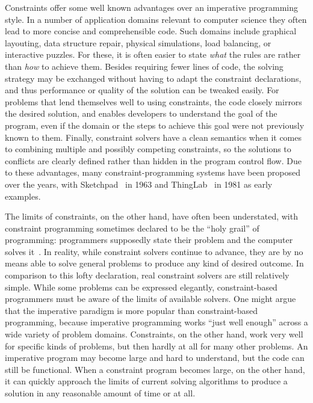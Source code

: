 Constraints offer some well known advantages over an imperative programming
style. In a number of application domains relevant to computer science they
often lead to more concise and comprehensible code. Such domains include
graphical layouting, data structure repair, physical simulations, load
balancing, or interactive puzzles. For these, it is often easier to state
\emph{what} the rules are rather than \emph{how} to achieve them. Besides
requiring fewer lines of code, the solving strategy may be exchanged without
having to adapt the constraint declarations, and thus performance or quality of
the solution can be tweaked easily. For problems that lend themselves well to
using constraints, the code closely mirrors the desired solution, and enables
developers to understand the goal of the program, even if the domain or the
steps to achieve this goal were not previously known to them. Finally, constraint
solvers have a clean semantics when it comes to combining multiple and possibly
competing constraints, so the solutions to conflicts are clearly defined rather
than hidden in the program control flow. Due to these advantages, many
constraint-programming systems have been proposed over the years, with
Sketchpad~\cite{sutherland-ifips-1963} in 1963 and
ThingLab~\cite{borning-toplas-1981} in 1981 as early examples.

The limits of constraints, on the other hand, have often been understated, with
constraint programming sometimes declared to be the ``holy grail'' of
programming: programmers supposedly state their problem and the computer solves
it~\cite{freuder1997holygrail}. In reality, while constraint solvers continue to
advance, they are by no means able to solve general problems to produce any kind
of desired outcome. In comparison to this lofty declaration, real constraint
solvers are still relatively simple. While some problems can be expressed
elegantly, constraint-based programmers must be aware of the limits of available
solvers. One might argue that the imperative paradigm is more popular than
constraint-based programming, because imperative programming works ``just well
enough'' across a wide variety of problem domains. Constraints, on the other
hand, work very well for specific kinds of problems, but then hardly at all for
many other problems. An imperative program may become large and hard to
understand, but the code can still be functional. When a constraint program
becomes large, on the other hand, it can quickly approach the limits of current
solving algorithms to produce a solution in any reasonable amount of time or at
all.

